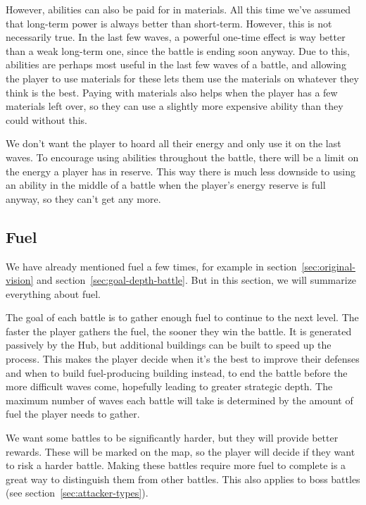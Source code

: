 However, abilities can also be paid for in materials.
All this time we've assumed that long-term power is always better than short-term.
However, this is not necessarily true.
In the last few waves, a powerful one-time effect is way better than a weak long-term one, since the battle is ending soon anyway.
Due to this, abilities are perhaps most useful in the last few waves of a battle, and allowing the player to use materials for these lets them use the materials on whatever they think is the best.
Paying with materials also helps when the player has a few materials left over, so they can use a slightly more expensive ability than they could without this.

We don't want the player to hoard all their energy and only use it on the last waves.
To encourage using abilities throughout the battle, there will be a limit on the energy a player has in reserve.
This way there is much less downside to using an ability in the middle of a battle when the player's energy reserve is full anyway, so they can't get any more.

\subsection{Fuel}\label{sec:design-fuel}

We have already mentioned fuel a few times, for example in section~\ref{sec:original-vision} and section~\ref{sec:goal-depth-battle}.
But in this section, we will summarize everything about fuel.

The goal of each battle is to gather enough fuel to continue to the next level.
The faster the player gathers the fuel, the sooner they win the battle.
It is generated passively by the Hub, but additional buildings can be built to speed up the process.
This makes the player decide when it's the best to improve their defenses and when to build fuel-producing building instead, to end the battle before the more difficult waves come, hopefully leading to greater strategic depth.
The maximum number of waves each battle will take is determined by the amount of fuel the player needs to gather.

\begin{notindemo}
    We want some battles to be significantly harder, but they will provide better rewards.
    These will be marked on the map, so the player will decide if they want to risk a harder battle.
    Making these battles require more fuel to complete is a great way to distinguish them from other battles.
    This also applies to boss battles (see section~\ref{sec:attacker-types}).
\end{notindemo}


